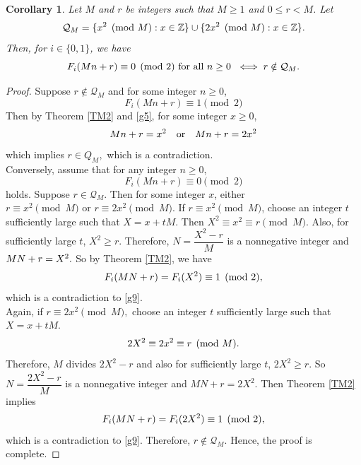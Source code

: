 \documentclass[12pt]{article}
\numberwithin{equation}{section}
\newtheorem{corollary}[theorem]{Corollary}
\theoremstyle{definition}
\theoremstyle{remark}
\numberwithin{equation}{section}
\begin{document}
\begin{corollary}\label{cm2}
Let $M$ and $r$ be integers such that  $M\geq1$ and $0\leq r<M$. Let
\begin{equation}
\mathcal Q_M
=
\{x^2\pmod M:x\in\mathbb Z\}
\cup
\{2x^2\pmod M:x\in\mathbb Z\}.\notag
\end{equation}
Then, for $i\in\{0,1\}$, we have 
\begin{equation}\label{g2}
F_i(Mn+r)\equiv0\pmod 2\text{ for all $n\geq0$ }
\iff
r\notin \mathcal Q_M.\notag
\end{equation}
\end{corollary}
\begin{proof}Suppose 
$
r\notin \mathcal Q_M
$ and  for some integer $n\ge0$, 
\begin{equation}\label{g5}
F_i(Mn+r)\equiv1\pmod 2
\end{equation} Then by Theorem \ref{TM2} and \eqref{g5}, for some integer $x\geq0$,
\begin{equation}
Mn+r=x^2
\quad \text{or} \quad
Mn+r=2x^2\notag
\end{equation}
 which implies $r\in Q_M,$ which is a contradiction.  \\
Conversely, assume that for any integer $n\ge 0$, 
\begin{equation}\label{g9}
F_i(Mn+r)\equiv0\pmod 2
\end{equation} holds.
Suppose $
r\in\mathcal Q_M.
$
Then for some integer $x$, either
$
r\equiv x^2\pmod M
\text{ or }
r\equiv2x^2\pmod M.
$
If $r\equiv x^2\pmod M$,  choose an integer $t$ sufficiently large such that
$
X=x+tM. $
Then
$
X^2\equiv x^2\equiv r\pmod M.$
Also, for sufficiently large $t$, $X^2\geq r$. Therefore, 
$
N=\dfrac{X^2-r}{M}$
is a nonnegative integer and 
$
MN+r=X^2.\notag
$
So by Theorem \ref{TM2}, we have
\begin{equation}
F_i(MN+r)=F_i(X^2)\equiv1\pmod 2,\notag
\end{equation}
which is a contradiction to  \eqref{g9}.\\
Again, if  $r\equiv2x^2\pmod M,$  choose an integer $t$ sufficiently large such that 
$
X=x+tM.
$
\begin{equation}
2X^2\equiv 2x^2\equiv r\pmod M.\notag
\end{equation}
Therefore, $M$ divides $2X^2-r$  and also for sufficiently large $t$, $2X^2\geq r$. So
$
N=\dfrac{2X^2-r}{M}$
is a nonnegative integer and $
MN+r=2X^2.$
Then Theorem \ref{TM2} implies
\begin{equation}
F_i(MN+r)=F_i(2X^2)\equiv1\pmod 2,\notag
\end{equation}
which is a contradiction to \eqref{g9}. Therefore, 
$
r\notin\mathcal Q_M.
$
Hence, the proof is complete.
\end{proof}
\end{document}
